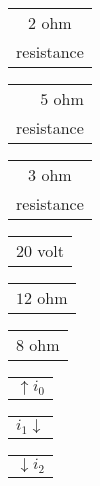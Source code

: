 \documentclass{book}
\begin{document}
{\small \renewcommand{\arraystretch}{.9}
                \circuitfont\begin{tabular}[t]{@{}c}
                   $2$ ohm \\
                   resistance
	        \end{tabular}}%
\stopmpxshipout
\mpxshipout%
{\small \renewcommand{\arraystretch}{.9}
                \circuitfont\begin{tabular}[t]{@{}r}
                   $5$ ohm \\
                   resistance
	        \end{tabular}}%
\stopmpxshipout
\mpxshipout%
{\small \renewcommand{\arraystretch}{.9}
                \circuitfont\begin{tabular}[b]{@{}c}
                   $3$ ohm \\
                   resistance
	        \end{tabular}}%
\stopmpxshipout
\mpxshipout%
{\small \renewcommand{\arraystretch}{.9}
                \circuitfont\begin{tabular}{@{}l}
                   $20$ volt 
	        \end{tabular}}%
\stopmpxshipout
\mpxshipout%
{\small \renewcommand{\arraystretch}{.9}
                \circuitfont\begin{tabular}{@{}r@{}}
                   $12$ ohm 
	        \end{tabular}}%
\stopmpxshipout
\mpxshipout%
{\small \renewcommand{\arraystretch}{.9}
                \circuitfont\begin{tabular}{@{}l@{}}
                   $8$ ohm 
	        \end{tabular}}%
\stopmpxshipout
\mpxshipout%
{\small \renewcommand{\arraystretch}{.9}
              \circuitfont\begin{tabular}{@{}l}
	        $\uparrow i_0$ 
	      \end{tabular}}%
\stopmpxshipout
\mpxshipout%
{\small \renewcommand{\arraystretch}{.9}
              \begin{tabular}[t]{@{}r@{}}
                  $i_1 \downarrow$    
              \end{tabular}}%
\stopmpxshipout
\mpxshipout%
{\small \renewcommand{\arraystretch}{.9}
              \begin{tabular}[t]{@{}l@{}}
                  $\downarrow i_2$    
              \end{tabular}}%
\end{document}
